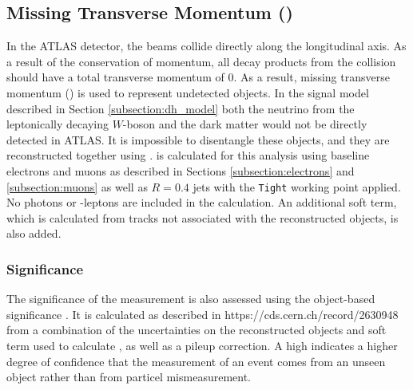 \subsection{Missing Transverse Momentum (\met)}
In the ATLAS detector, the beams collide directly along the longitudinal axis. As a result of the conservation of momentum, all decay products from the collision should have a total transverse momentum of 0. As a result, missing transverse momentum (\met) is used to represent undetected objects. In the signal model described in Section \ref{subsection:dh_model} both the neutrino from the leptonically decaying $W$-boson and the dark matter would not be directly detected in ATLAS. It is impossible to disentangle these objects, and they are reconstructed together using \met. \met is calculated for this analysis using baseline electrons and muons as described in Sections \ref{subsection:electrons} and \ref{subsection:muons} as well as $R=0.4$ jets with the \verb|Tight| working point applied. No photons or \tau-leptons are included in the calculation. An additional soft term, which is calculated from tracks not associated with the reconstructed objects, is also added.

\subsubsection{\met Significance}
The significance of the \met measurement is also assessed using the object-based \met significance \metsig. It is calculated as described in https://cds.cern.ch/record/2630948 from a combination of the uncertainties on the reconstructed objects and soft term used to calculate \met, as well as a pileup correction. A high \metsig indicates a higher degree of confidence that the \met measurement of an event comes from an unseen object rather than from particel mismeasurement.
